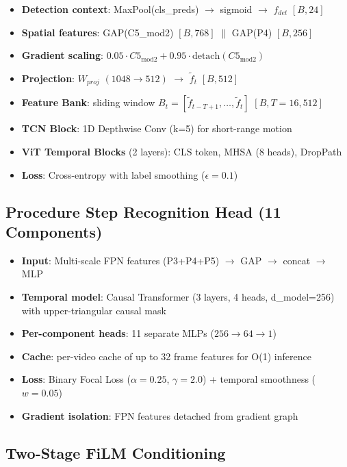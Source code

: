 \documentclass[10pt,twocolumn]{article}
\begin{document}
\begin{itemize}[nosep]
\item \textbf{Detection context}: MaxPool(cls\_preds) $\rightarrow$ sigmoid $\rightarrow$ $f_{det}$ $[B, 24]$
\item \textbf{Spatial features}: GAP(C5\_mod2) $[B, 768]$ $\|$ GAP(P4) $[B, 256]$
\item \textbf{Gradient scaling}: $0.05 \cdot C5_{\text{mod2}} + 0.95 \cdot \text{detach}(C5_{\text{mod2}})$
\item \textbf{Projection}: $W_{proj}$ $(1048 \rightarrow 512)$ $\rightarrow$ $\tilde{f}_t$ $[B, 512]$
\item \textbf{Feature Bank}: sliding window $B_t = [\tilde{f}_{t-T+1}, \ldots, \tilde{f}_t]$ $[B, T=16, 512]$
\item \textbf{TCN Block}: 1D Depthwise Conv (k=5) for short-range motion
\item \textbf{ViT Temporal Blocks} (2 layers): CLS token, MHSA (8 heads), DropPath
\item \textbf{Loss}: Cross-entropy with label smoothing ($\epsilon=0.1$)
\end{itemize}

\subsection{Procedure Step Recognition Head (11 Components)}

\begin{itemize}[nosep]
\item \textbf{Input}: Multi-scale FPN features (P3+P4+P5) $\rightarrow$ GAP $\rightarrow$ concat $\rightarrow$ MLP
\item \textbf{Temporal model}: Causal Transformer (3 layers, 4 heads, d\_model=256) with upper-triangular causal mask
\item \textbf{Per-component heads}: 11 separate MLPs ($256 \rightarrow 64 \rightarrow 1$)
\item \textbf{Cache}: per-video cache of up to 32 frame features for O(1) inference
\item \textbf{Loss}: Binary Focal Loss ($\alpha=0.25$, $\gamma=2.0$) + temporal smoothness ($w=0.05$)
\item \textbf{Gradient isolation}: FPN features detached from gradient graph
\end{itemize}

\subsection{Two-Stage FiLM Conditioning}
\label{sec:film-conditioning}
\end{document}
